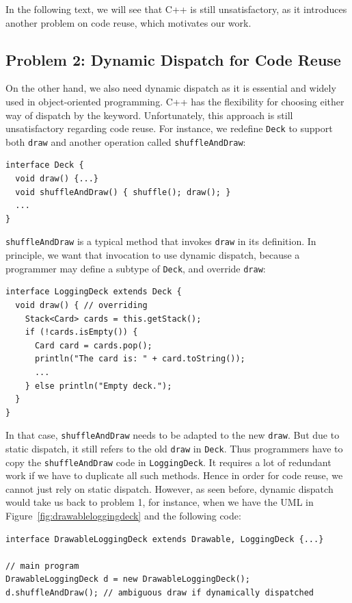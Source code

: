 In the following text, we will see that C++ is still unsatisfactory, as it introduces another problem on code reuse, which motivates
our work.

\subsection{Problem 2: Dynamic Dispatch for Code Reuse}\label{subsec:problem2}

On the other hand, we also need dynamic dispatch as it is essential and widely used in object-oriented programming.
C++ has the flexibility for choosing either way of dispatch by the \kwvirtual{} keyword.
Unfortunately, this approach is still unsatisfactory regarding code reuse. For instance, 
we redefine \lstinline|Deck| to support
both \lstinline|draw| and another operation called \lstinline|shuffleAndDraw|:
\vspace{3pt}\begin{lstlisting}
interface Deck {
  void draw() {...}
  void shuffleAndDraw() { shuffle(); draw(); }
  ...
}
\end{lstlisting}\vspace{3pt}
\lstinline|shuffleAndDraw| is a typical method that invokes \lstinline|draw| in its definition. In principle, we want
that invocation to use dynamic dispatch, because a programmer may define a subtype of \lstinline|Deck|, and override \lstinline|draw|:
\vspace{3pt}\begin{lstlisting}
interface LoggingDeck extends Deck {
  void draw() { // overriding
    Stack<Card> cards = this.getStack();
    if (!cards.isEmpty()) {
      Card card = cards.pop();
      println("The card is: " + card.toString());
      ...
    } else println("Empty deck.");
  }
}
\end{lstlisting}\vspace{3pt}
In that case, \lstinline|shuffleAndDraw| needs to be adapted to the new \lstinline|draw|. But due to static dispatch,
it still refers to the old \lstinline|draw| in \lstinline|Deck|. Thus programmers have to copy the \lstinline|shuffleAndDraw| code in
\lstinline|LoggingDeck|. It requires a lot of redundant work if we have to duplicate all such methods. Hence in order for code reuse,
we cannot just rely on static dispatch. However, as seen before, dynamic dispatch would take us back to problem 1, for instance, when we
have the UML in Figure~\ref{fig:drawableloggingdeck} and the following code:
\vspace{3pt}\begin{lstlisting}
interface DrawableLoggingDeck extends Drawable, LoggingDeck {...}

// main program
DrawableLoggingDeck d = new DrawableLoggingDeck();
d.shuffleAndDraw(); // ambiguous draw if dynamically dispatched
\end{lstlisting}\vspace{3pt}

